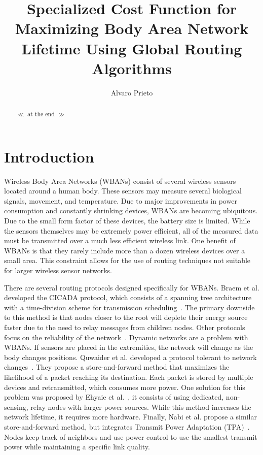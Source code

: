 \documentclass{article}
\begin{document}
\title{Specialized Cost Function for Maximizing Body Area Network Lifetime Using Global Routing Algorithms}
\author{Alvaro Prieto}
\maketitle

\begin{abstract}
$\ll$ at the end $\gg$
\end{abstract}

\section{Introduction}
Wireless Body Area Networks (WBANs) consist of several wireless sensors located around a human body. These sensors may measure several biological signals, movement, and temperature. Due to major improvements in power consumption and constantly shrinking devices, WBANs are becoming ubiquitous. Due to the small form factor of these devices, the battery size is limited. While the sensors themselves may be extremely power efficient, all of the measured data must be transmitted over a much less efficient wireless link. One benefit of WBANs is that they rarely include more than a dozen wireless devices over a small area. This constraint allows for the use of routing techniques not suitable for larger wireless sensor networks.

There are several routing protocols designed specifically for WBANs. Braem et al. developed the CICADA protocol, which consists of a spanning tree architecture with a time-division scheme for transmission scheduling~\cite{protocol:CICADA}. The primary downside to this method is that nodes closer to the root will deplete their energy source faster due to the need to relay messages from children nodes. Other protocols focus on the reliability of the network~\cite{routing:storeandforward}. Dynamic networks are a problem with WBANs. If sensors are placed in the extremities, the network will change as the body changes positions. Quwaider et al. developed a protocol tolerant to network changes~\cite{routing:storeandforward}. They propose a store-and-forward method that maximizes the likelihood of a packet reaching its destination. Each packet is stored by multiple devices and retransmitted, which consumes more power. One solution for this problem was proposed by Ehyaie et al.~\cite{relay:networklife}, it consists of using dedicated, non-sensing, relay nodes with larger power sources. While this method increases the network lifetime, it requires more hardware. Finally, Nabi et al. propose a similar store-and-forward method, but integrates Transmit Power Adaptation (TPA)~\cite{relay:transmitpoweradaptation}. Nodes keep track of neighbors and use power control to use the smallest transmit power while maintaining a specific link quality.
\end{document}
